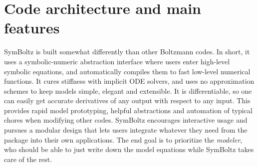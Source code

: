 \documentclass{aa}
\begin{document}
\section{Code architecture and main features}
\label{sec:features}

\iffalse
In principle, the task of a Boltzmann solver is very simple:
to solve a system of ordinary differential equations (ODEs) for some initial conditions and parameters (usually including several perturbation wavenumbers), and compute desired derived quantities from their solution, such as power spectra or distances.

In practice, however, several difficulties complicate this task.
First, the equations separate into computational stages that benefit substantially (for performance and stability) from being solved sequentially (each with splined input from the previous stage), such as the background and perturbations stages, which must be joined and tends to fragment code.
Second, the set of equations is long and convoluted, and different subsets of the equations should be replaceable for different cosmological (sub)models, and organizing a code with a suitable modular structure is hard.
Third, wildly different time scales coexist in the equations, making them extremely stiff and intractable for standard explicit ODE solvers, so this stiffness must be massaged away in the equations or dealt with numerically.
Fourth, some models are formulated as boundary value problems with both initial (in the early universe) and final (today) conditions, which typically requires a shooting method around the entire ODE solver that readjusts initial conditions until hitting the final constraints.
\fi

SymBoltz is built somewhat differently than other Boltzmann codes.
In short, it uses a symbolic-numeric abstraction interface where users enter high-level symbolic equations, and automatically compiles them to fast low-level numerical functions.
It cures stiffness with implicit ODE solvers, and uses no approximation schemes to keep models simple, elegant and extensible.
It is differentiable, so one can easily get accurate derivatives of any output with respect to any input.
This provides rapid model prototyping, helpful abstractions and automation of typical chores when modifying other codes.
SymBoltz encourages interactive usage and pursues a modular design that lets users integrate whatever they need from the package into their own applications.
The end goal is to prioritize the \emph{modeler}, who should be able to just write down the model equations while SymBoltz takes care of the rest.
\end{document}
